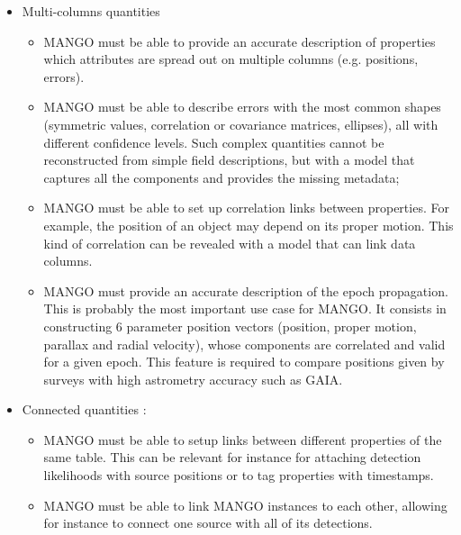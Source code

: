 \documentclass[11pt,a4paper]{ivoa}
\begin{document}
\begin{itemize}
    \item Multi-columns quantities
       \begin{itemize}[noitemsep,topsep=0pt,parsep=0pt,partopsep=0pt]
          \item MANGO must be able to provide an accurate description of properties which attributes are spread 
                out on multiple columns (e.g. positions, errors).
          \item MANGO must be able to describe errors with the most common shapes (symmetric values, correlation 
                or covariance matrices, ellipses), all with different confidence levels. 
                Such complex quantities cannot be reconstructed from simple field descriptions, but with a model
                that captures all the components and provides the missing metadata;
          \item MANGO must be able to set up correlation links between properties. For example,
                the position of an object may depend on its proper motion. This kind of correlation can be revealed 
                with a model that can link data columns.
          \item MANGO must provide an accurate description of the epoch propagation. 
                This is probably the most important use case for MANGO. It consists in constructing 6 parameter     		position vectors (position, proper motion, parallax and radial velocity), whose components are 			correlated and valid for a given epoch. 
                This feature is required to compare positions given by surveys with high astrometry accuracy such as GAIA.
       \end{itemize} 
         
    \item Connected quantities : 
       \begin{itemize}[noitemsep,topsep=0pt,parsep=0pt,partopsep=0pt]
           \item MANGO must be able to setup links between different properties of the same table. 
                 This can be relevant for instance for attaching detection likelihoods with source positions
                 or to tag properties with timestamps.
           \item MANGO must be able to link MANGO instances to each other, allowing for instance to connect one 
                 source with all of its detections.
        \end{itemize}   
\end{itemize}
\end{document}
